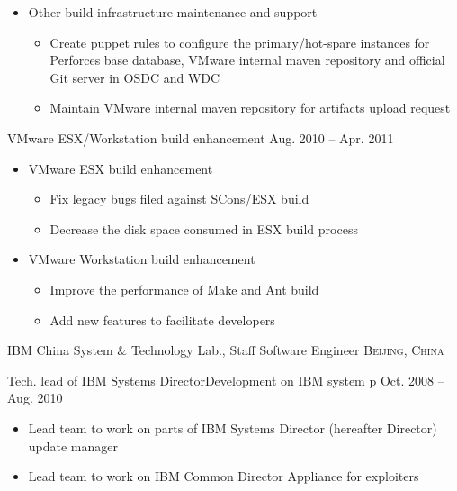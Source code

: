 \documentclass[10pt,letterpaper]{article}
\begin{document}
{{\begin{itemize}
\begin{itemize}
                \item Improve the infrastructure to create Git account for MTS and AWF
                \item Consolidate VMware internal version of git-p4 and fix bugs
                \item Maintain VMware legacy gitorious server and fix bugs
            \end{itemize}
        \item Other build infrastructure maintenance and support
            \begin{itemize}
                \item Create puppet rules to configure the primary/hot-spare instances for
                    Perforces base database, VMware internal maven repository and official Git
                    server in OSDC and WDC
                \item Maintain VMware internal maven repository for artifacts upload request
            \end{itemize}

    \end{itemize}
}
\headedsubsection %
{VMware ESX/Workstation build enhancement} {Aug. 2010 -- Apr. 2011}
{
    \begin{itemize}
        \item VMware ESX build enhancement
            \begin{itemize}
                \item Fix legacy bugs filed against SCons/ESX build
                \item Decrease the disk space consumed in ESX build process
            \end{itemize}
        \item VMware Workstation build enhancement
            \begin{itemize}
            \item Improve the performance of Make and Ant build
            \item Add new features to facilitate developers
            \end{itemize}
    \end{itemize}
}
}




\headedsection 
{IBM China System \& Technology Lab., Staff Software Engineer}
{\textsc{Beijing, China}} {

\headedsubsection %
{Tech. lead of IBM Systems Director\texttrademark Development on IBM system p}
{Oct. 2008 -- Aug. 2010}
{
    \begin{itemize}
        \item Lead team to work on parts of IBM Systems Director\texttrademark
            (hereafter Director) update manager
        \item Lead team to work on IBM Common Director Appliance for exploiters
    \end{itemize}
}
}
\end{document}

